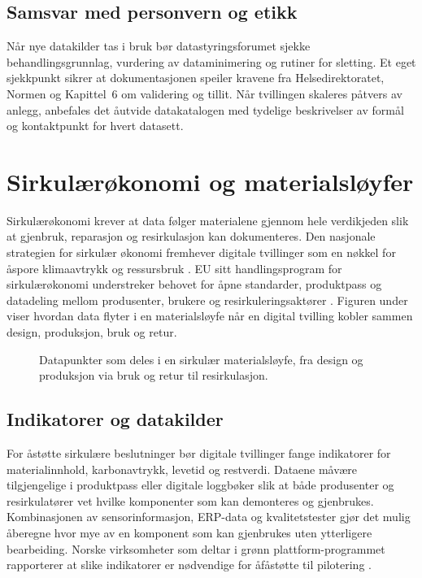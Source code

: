 \subsection{Samsvar med personvern og etikk}
N\aa r nye datakilder tas i bruk b\o r datastyringsforumet sjekke behandlingsgrunnlag, vurdering av dataminimering og rutiner for sletting. Et eget sjekkpunkt sikrer at dokumentasjonen speiler kravene fra Helsedirektoratet, Normen og Kapittel~6 om validering og tillit. N\aa r tvillingen skaleres p\aa tvers av anlegg, anbefales det \aa utvide datakatalogen med tydelige beskrivelser av form\aa l og kontaktpunkt for hvert datasett.

\section{Sirkul\ae r\o konomi og materialsl\o yfer}
Sirkul\ae r\o konomi krever at data f\o lger materialene gjennom hele verdikjeden slik at gjenbruk, reparasjon og resirkulasjon kan dokumenteres. Den nasjonale strategien for sirkul\ae r \o konomi fremhever digitale tvillinger som en n\o kkel for \aa spore klimaavtrykk og ressursbruk \citep{regjeringen2021sirkulaer}. EU sitt handlingsprogram for sirkul\ae r\o konomi understreker behovet for \aa pne standarder, produktpass og datadeling mellom produsenter, brukere og resirkuleringsakt\o rer \citep{eu2020circulareconomy}. Figuren under viser hvordan data flyter i en materialsl\o yfe n\aa r en digital tvilling kobler sammen design, produksjon, bruk og retur.

\begin{figure}[ht]
    \centering
    \resizebox{0.85\textwidth}{!}{}
    \caption{Datapunkter som deles i en sirkul\ae r materialsl\o yfe, fra design og produksjon via bruk og retur til resirkulasjon.}
    \label{fig:kap03-sirkular}
\end{figure}

\subsection{Indikatorer og datakilder}
For \aa st\o tte sirkul\ae re beslutninger b\o r digitale tvillinger fange indikatorer for materialinnhold, karbonavtrykk, levetid og restverdi. Dataene m\aa v\ae re tilgjengelige i produktpass eller digitale loggb\o ker slik at b\aa de produsenter og resirkulat\o rer vet hvilke komponenter som kan demonteres og gjenbrukes. Kombinasjonen av sensorinformasjon, ERP-data og kvalitetstester gj\o r det mulig \aa beregne hvor mye av en komponent som kan gjenbrukes uten ytterligere bearbeiding. Norske virksomheter som deltar i gr\o nn plattform-programmet rapporterer at slike indikatorer er n\o dvendige for \aa f\aa st\o tte til pilotering \citep{miljodir2022sirkular}.

